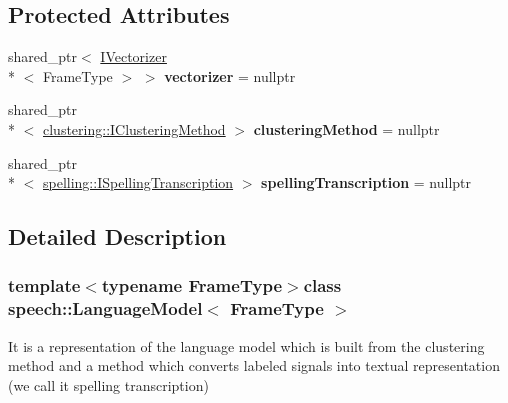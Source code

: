\subsection*{Protected Attributes}
\begin{DoxyCompactItemize}
\item 
\hypertarget{classspeech_1_1LanguageModel_a5929f6de00b952d3094c8dd7bb240d05}{shared\+\_\+ptr$<$ \hyperlink{classspeech_1_1vectorizer_1_1IVectorizer}{I\+Vectorizer}\\*
$<$ Frame\+Type $>$ $>$ {\bfseries vectorizer} = nullptr}\label{classspeech_1_1LanguageModel_a5929f6de00b952d3094c8dd7bb240d05}

\item 
\hypertarget{classspeech_1_1LanguageModel_ac846feac8765604343d901e35de07c2a}{shared\+\_\+ptr\\*
$<$ \hyperlink{classspeech_1_1clustering_1_1IClusteringMethod}{clustering\+::\+I\+Clustering\+Method} $>$ {\bfseries clustering\+Method} = nullptr}\label{classspeech_1_1LanguageModel_ac846feac8765604343d901e35de07c2a}

\item 
\hypertarget{classspeech_1_1LanguageModel_a20b08c539071cd3dcbd49e59c3bc08f2}{shared\+\_\+ptr\\*
$<$ \hyperlink{classspeech_1_1spelling_1_1ISpellingTranscription}{spelling\+::\+I\+Spelling\+Transcription} $>$ {\bfseries spelling\+Transcription} = nullptr}\label{classspeech_1_1LanguageModel_a20b08c539071cd3dcbd49e59c3bc08f2}

\end{DoxyCompactItemize}


\subsection{Detailed Description}
\subsubsection*{template$<$typename Frame\+Type$>$class speech\+::\+Language\+Model$<$ Frame\+Type $>$}

It is a representation of the language model which is built from the clustering method and a method which converts labeled signals into textual representation (we call it spelling transcription) 

